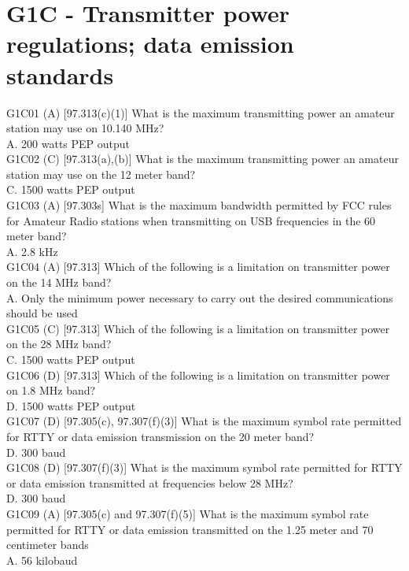 \documentclass[12pt,letterpaper]{report}
\begin{document}
\section{G1C - Transmitter power regulations; data emission standards}


G1C01 (A) [97.313(c)(1)] What is the maximum transmitting power an amateur station may use on 10.140 MHz?\\
A. 200 watts PEP output\\

G1C02 (C) [97.313(a),(b)]  What is the maximum transmitting power an amateur station may use on the 12 meter band?\\
C. 1500 watts PEP output\\

G1C03 (A) [97.303s]  What is the maximum bandwidth permitted by FCC rules for Amateur Radio stations when transmitting on USB frequencies in the 60 meter band?\\
A. 2.8 kHz\\

G1C04 (A) [97.313] Which of the following is a limitation on transmitter power on the 14 MHz band?\\
A. Only the minimum power necessary to carry out the desired communications should be used\\

G1C05 (C) [97.313] Which of the following is a limitation on transmitter power on the 28 MHz band?\\
C. 1500 watts PEP output\\

G1C06 (D) [97.313] Which of the following is a limitation on transmitter power on 1.8 MHz band?\\
D. 1500 watts PEP output\\

G1C07 (D) [97.305(c), 97.307(f)(3)] What is the maximum symbol rate permitted for RTTY or data emission transmission on the 20 meter band?\\
D. 300 baud\\

G1C08 (D) [97.307(f)(3)] What is the maximum symbol rate permitted for RTTY or data emission transmitted at frequencies below 28 MHz? \\
D. 300 baud \\

G1C09 (A) [97.305(c) and 97.307(f)(5)] What is the maximum symbol rate permitted for RTTY or data emission transmitted on the 1.25 meter and 70 centimeter bands\\
A. 56 kilobaud \\
\end{document}
